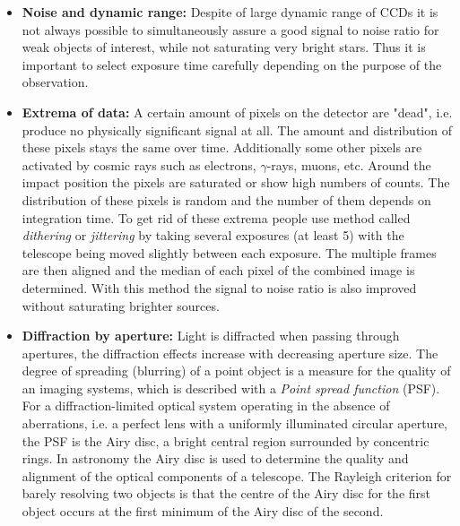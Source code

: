 \begin{itemize}

\item\textbf{Noise and dynamic range:}
Despite of large dynamic range of CCDs it is not always possible to simultaneously assure a good signal to noise ratio for weak objects of interest, while not saturating very bright stars. Thus it is important to select exposure time carefully depending on the purpose of the observation.

\item\textbf{Extrema of data:}
A certain amount of pixels on the detector are "dead", i.e. produce no physically significant signal at all. The amount and distribution of these pixels stays the same over time. Additionally some other pixels are activated by cosmic rays such as electrons, $\gamma$-rays, muons, etc. Around the impact position the pixels are saturated or show high numbers of counts. The distribution of these pixels is random and the number of them depends on integration time. To get rid of these extrema people use method called \textit{dithering} or \textit{jittering} by taking several exposures (at least 5) with the telescope being moved slightly between each exposure. The multiple frames are then aligned and the median of each pixel of the combined image is determined. With this method the signal to noise ratio is also improved without saturating brighter sources.

\item\textbf{Diffraction by aperture:}
Light is diffracted when passing through apertures, the diffraction effects increase with decreasing aperture size. The degree of spreading (blurring) of a point object is a measure for the quality of an imaging systems, which is described with a \textit{Point spread function} (PSF). For a diffraction-limited optical system operating in the absence of aberrations, i.e. a perfect lens with a uniformly illuminated circular aperture, the PSF is the Airy disc, a bright central region surrounded by concentric rings. In astronomy the Airy disc is used to determine the quality and alignment of the optical components of a telescope. The Rayleigh criterion for barely resolving two objects is that the centre of the Airy disc for the first object occurs at the first minimum of the Airy disc of the second.

\end{itemize}

